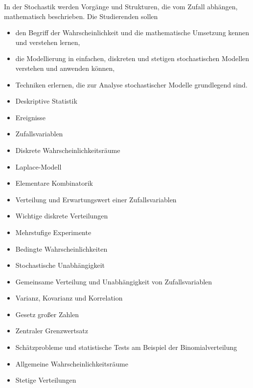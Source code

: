 \begin{module}
\begin{learningoutcomes}
In der Stochastik werden Vorgänge und Strukturen, die vom Zufall abhängen, mathematisch beschrieben. Die Studierenden sollen

 \begin{itemize}\item den Begriff der Wahrscheinlichkeit und die mathematische Umsetzung kennen und verstehen lernen,  \item die Modellierung in einfachen, diskreten und stetigen stochastischen Modellen verstehen und anwenden können,  \item Techniken erlernen, die zur Analyse stochastischer Modelle grundlegend sind.  \end{itemize}
\end{learningoutcomes}

\begin{content}
\begin{itemize}\item Deskriptive Statistik  \item Ereignisse  \item Zufallsvariablen  \item Diskrete Wahrscheinlichkeitsräume  \item Laplace-Modell  \item Elementare Kombinatorik  \item Verteilung und Erwartungswert einer Zufallsvariablen  \item Wichtige diskrete Verteilungen  \item Mehrstufige Experimente  \item Bedingte Wahrscheinlichkeiten  \item Stochastische Unabhängigkeit  \item Gemeinsame Verteilung und Unabhängigkeit von Zufallsvariablen  \item Varianz, Kovarianz und Korrelation  \item Gesetz großer Zahlen  \item Zentraler Grenzwertsatz  \item Schätzprobleme und statistische Tests am Beispiel der Binomialverteilung  \item Allgemeine Wahrscheinlichkeitsräume  \item Stetige Verteilungen  \end{itemize}
\end{content}



\end{module}

